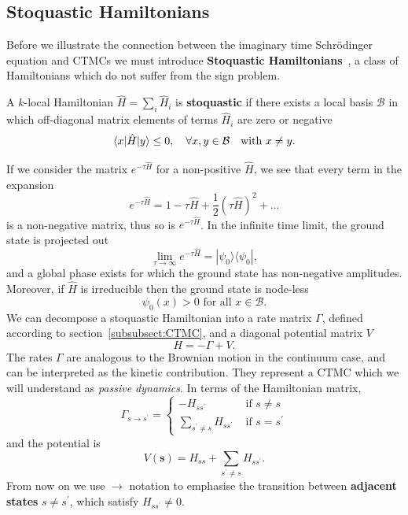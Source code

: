 \subsection{Stoquastic Hamiltonians}
\label{subsec:fk-latt}
Before we illustrate the connection between the imaginary time Schr\" odinger equation and CTMCs we must introduce \textbf{Stoquastic Hamiltonians}~\cite{bravyi2006complexity}, a class of Hamiltonians which do not suffer from the sign problem.
\begin{definition}
	A $k$-local Hamiltonian $\hat H=\sum_{i} \hat H_{i}$ is \textbf{stoquastic} if there exists a local basis $\mathcal{B}$ in which off-diagonal matrix elements of terms $\hat{H}_i$ are zero or negative
	\begin{equation}
		\langle x|\hat H| y\rangle \leq 0, \quad \forall x, y \in \mathcal{B} \text {\quad with } x \neq y.
	\end{equation}
\end{definition}
\noindent
If we consider the matrix $e^{-\tau \hat H}$ for a non-positive $\hat H$, we see that every term in the expansion
\begin{equation}
	e^{-\tau \hat{H}} = 1 -\tau \hat{H} + \frac{1}{2}(\tau \hat{H})^2 + \ldots
\end{equation}
is a non-negative matrix, thus so is $e^{-\tau \hat H}$. In the infinite time limit, the ground state is projected out
\begin{equation}
	\lim _{\tau \rightarrow \infty} e^{-\tau \hat H}=|\psi_0\rangle\langle\psi_0|, 
\end{equation}
and a global phase exists for which the ground state has non-negative amplitudes. Moreover, if $\hat H$ is irreducible then the ground state is node-less~\cite{discussion_stoquastic2017}
\begin{equation}
	\psi_0(x)>0 \text { for all } x \in \mathcal{B}.
\end{equation}
We can decompose a stoquastic Hamiltonian into a rate matrix $\Gamma$, defined according to section~\ref{subsubsect:CTMC}, and a diagonal potential matrix $V$
\begin{equation}
	\label{eq:hamilton_split}
	H = -\Gamma + V.
\end{equation}
The rates $\Gamma$ are analogous to the Brownian motion in the continuum case, and can be interpreted as the kinetic contribution. They represent a CTMC which we will understand as \emph{passive dynamics}. In terms of the Hamiltonian matrix,
\begin{equation}
\Gamma_{s \rightarrow s^{\prime}}=\left\{\begin{array}{ll}
-H_{s s^{\prime}} & \text { if } s \neq s \\
\sum_{s^{\prime} \neq s} H_{s s^{\prime}} & \text { if } s=s^{\prime}
\end{array}\right.
\end{equation}
and the potential is
\begin{equation}
V(\boldsymbol{s})=H_{s s}+\sum_{s^{\prime} \neq s} H_{s s^{\prime}}.
\end{equation}
From now on we use $\rightarrow$ notation to emphasise the transition between \textbf{adjacent states} $s\neq s^\prime$, which satisfy $H_{s s^{\prime}} \neq 0$. 


